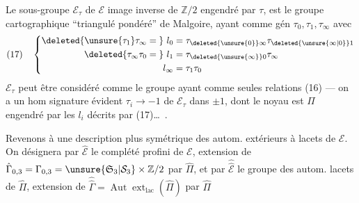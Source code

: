 Le sous-groupe $\mathcal E_\tau$ de $\mathcal E$ image inverse de $\mathbb Z/2$ engendré par $\tau$, est le groupe cartographique ``triangulé pondéré'' de Malgoire, ayant comme gén $\tau_0,\tau_1,\tau_\infty$  avec
\[
(17)\quad\left\{\begin{aligned}
\deleted{\unsure{\tau_1}\tau_\infty={}}\ l_0&=\tau_{\deleted{\unsure{0}}\infty}\tau_{\deleted{\unsure{\infty|0}}1}\\
\deleted{\tau_\infty\tau_0={}}\ l_1&=\tau_{\deleted{\unsure{\infty}}0}\tau_\infty\\
l_\infty&=\tau_1\tau_0
\end{aligned}\right.
\]
$\mathcal E_\tau$ peut être considéré comme le groupe ayant comme  seules relations (16) --- on a un hom signature évident $\tau_i\longrightarrow-1$ de $\mathcal E_\tau$ dans $\pm1$, dont le noyau est $\Pi$ engendré par les $l_i$ décrits par (17)\ldots\ .

Revenons à une description plus symétrique des autom. extérieurs à lacets de $\mathcal E$. On désignera par $\hat{\mathcal E}$ le complété profini de $\mathcal E$, extension de $\hat\Gamma_{0,3}=\Gamma_{0,3}=\unsure{\mathfrak S_3|\mathcal S_3}\times\mathbb Z/2$ par $\hat\Pi$, et par $\widehat{\widehat{\mathcal E}}$ le groupe des autom.   lacets de $\hat\Pi$, extension de $\widehat{\widehat\Gamma}=\operatorname{Aut}\operatorname{ext}_{\mathrm{lac}}(\hat\Pi)$ par $\hat\Pi$
